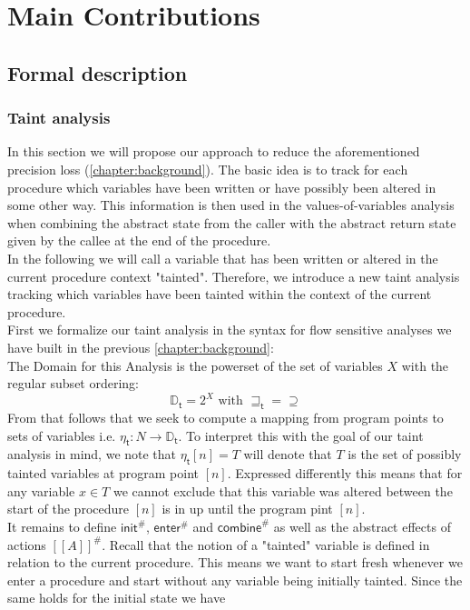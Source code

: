 
\chapter{Main Contributions}\label{chapter:mainContributions}

  \section{Formal description}
    \subsection{Taint analysis}
      In this section we will propose our approach to reduce the aforementioned precision loss (\autoref{chapter:background}). The basic idea is to track for each procedure which variables have been written or have possibly been altered in some other way. This information is then used in the values-of-variables analysis when combining the abstract state from the caller with the abstract return state given by the callee at the end of the procedure.\\
      In the following we will call a variable that has been written or altered in the current procedure context "tainted". Therefore, we introduce a new taint analysis tracking which variables have been tainted within the context of the current procedure.\\
      First we formalize our taint analysis in the syntax for flow sensitive analyses we have built in the previous \autoref{chapter:background}:\\
      The Domain for this Analysis is the powerset of the set of variables $X$ with the regular subset ordering:
      \[\mathbb{D}_\textsf{t} = 2^X \text{ with } \sqsupseteq_\textsf{t} = \supseteq\]
      From that follows that we seek to compute a mapping from program points to sets of variables i.e. $\eta_\textsf{t}: N \rightarrow \mathbb{D}_\textsf{t}$. To interpret this with the goal of our taint analysis in mind, we note that $\eta_\textsf{t} [n] = T$ will denote that $T$ is the set of possibly tainted variables at program point $[n]$. Expressed differently this means that for any variable $x \in T$ we cannot exclude that this variable was altered between the start of the procedure $[n]$ is in up until the program pint $[n]$.\\
      It remains to define $\textsf{init}^{\#}$, $\textsf{enter}^{\#}$ and $\textsf{combine}^{\#}$ as well as the abstract effects of actions $[\![  A ]\!]^{\#}$. Recall that the notion of a "tainted" variable is defined in relation to the current procedure. This means we want to start fresh whenever we enter a procedure and start without any variable being initially tainted. Since the same holds for the initial state we have 
